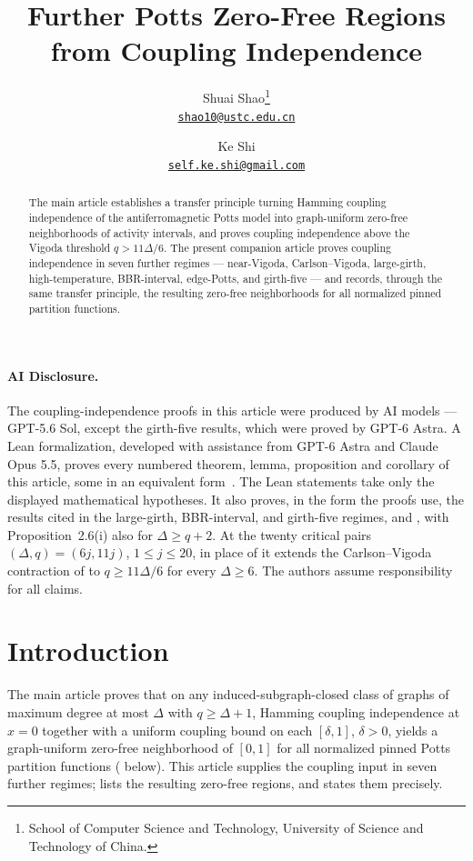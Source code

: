 \documentclass[11pt,reqno]{article}
\title{\bfseries Further Potts Zero-Free Regions from Coupling Independence}
\author{Shuai Shao\thanks{School of Computer Science and Technology,
    University of Science and Technology of China.}\\
  \href{mailto:shao10@ustc.edu.cn}{\texttt{shao10@ustc.edu.cn}}
\and
Ke Shi\footnotemark[1]\\
\href{mailto:self.ke.shi@gmail.com}{\texttt{self.ke.shi@gmail.com}}}
\date{}
\theoremstyle{plain}
\theoremstyle{definition}
\theoremstyle{remark}
\newcommand{\Deg}{\Delta}                        %
\begin{document}
\maketitle

\begin{abstract}
The main article \cite{ShaoShi2026ZeroFreeness} establishes a transfer principle
turning Hamming coupling independence of the antiferromagnetic Potts model
into graph-uniform zero-free neighborhoods of activity intervals, and
proves coupling independence above the Vigoda threshold
\(q>11\Deg/6\).  The present companion article proves coupling
independence in seven further regimes --- near-Vigoda, Carlson--Vigoda,
large-girth, high-temperature, BBR-interval, edge-Potts, and girth-five
--- and records, through the same transfer principle, the resulting
zero-free neighborhoods for all normalized pinned partition functions.
\end{abstract}

\paragraph*{AI Disclosure.}
The coupling-independence proofs in this article were produced by AI
models --- GPT-5.6 Sol, except the girth-five results, which were proved
by GPT-6 Astra.  A Lean formalization, developed with assistance from
GPT-6 Astra and Claude Opus 5.5, proves every numbered
theorem, lemma, proposition and corollary of this article, some in an
equivalent form~\cite{Shi2026Formalization}.
The Lean statements take only the displayed mathematical hypotheses.
It also proves, in the form the proofs use, the results cited in the
large-girth, BBR-interval, and girth-five regimes,
\cite[Lemmas~5.13 and~8.7 and Equation~(10)]{CLMM2023} and
\cite[Proposition~2.6(i) and Theorem~2.5]{BencsBerrekkalRegts2025Trees},
with Proposition~2.6(i) also for \(\Deg\ge q+2\).
At the twenty critical pairs \((\Deg,q)=(6j,11j)\), \(1\le j\le20\), in
place of \cite[Theorem~20]{CFFGZZ2024} it extends the Carlson--Vigoda
contraction of  to \(q\ge11\Deg/6\) for every
\(\Deg\ge6\).  The authors assume responsibility for all claims.

\setcounter{tocdepth}{2}
\tableofcontents

\section{Introduction}
\label{sec:companion-intro}

The main article \cite{ShaoShi2026ZeroFreeness} proves that on any
induced-subgraph-closed class of graphs of maximum degree at most
\(\Deg\) with \(q\ge\Deg+1\), Hamming coupling independence at \(x=0\)
together with a uniform coupling bound on each \([\delta,1]\),
\(\delta>0\), yields a graph-uniform zero-free neighborhood of
\([0,1]\) for all normalized pinned Potts partition functions
( below).  This article supplies the coupling
input in seven further regimes;  lists the
resulting zero-free regions, and
 states them precisely.
\end{document}
